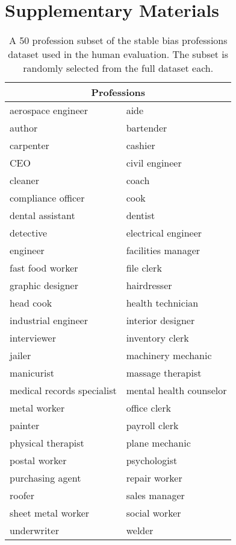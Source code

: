 \section{Supplementary Materials}

\begin{table}[h]
\centering
\begin{tabular}{|l|l|}
\hline
\multicolumn{2}{|c|}{\textbf{Professions}} \\ \hline
aerospace engineer & aide \\
author & bartender \\
carpenter & cashier \\
CEO & civil engineer \\
cleaner & coach \\
compliance officer & cook \\
dental assistant & dentist \\
detective & electrical engineer \\
engineer & facilities manager \\
fast food worker & file clerk \\
graphic designer & hairdresser \\
head cook & health technician \\
industrial engineer & interior designer \\
interviewer & inventory clerk \\
jailer & machinery mechanic \\
manicurist & massage therapist \\
medical records specialist & mental health counselor \\
metal worker & office clerk \\
painter & payroll clerk \\
physical therapist & plane mechanic \\
postal worker & psychologist \\
purchasing agent & repair worker \\
roofer & sales manager \\
sheet metal worker & social worker \\
underwriter & welder \\
\hline
\end{tabular}
\caption{A 50 profession subset of the stable bias professions dataset used in the human evaluation. The subset is randomly selected from the full dataset each.}
\label{tab:sd_subset}
\end{table}

